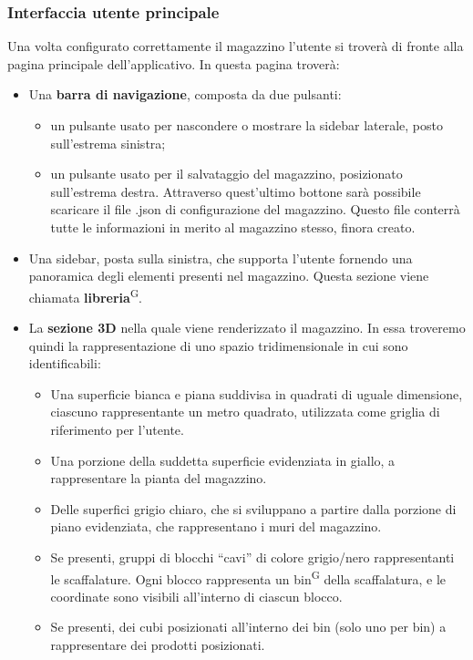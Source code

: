         \subsubsection{Interfaccia utente principale}
        Una volta configurato correttamente il magazzino l'utente si troverà di fronte alla pagina principale dell'applicativo. 
        In questa pagina troverà: 
        \begin{itemize}
            \item Una \textbf{barra di navigazione}, composta da due pulsanti: 
            \begin{itemize}
                \item un pulsante usato per nascondere o mostrare la sidebar laterale, posto sull'estrema sinistra;
                \item un pulsante usato per il salvataggio del magazzino, posizionato sull'estrema destra. Attraverso quest'ultimo bottone sarà possibile scaricare il file .json di configurazione del magazzino. Questo file conterrà tutte le informazioni in merito al magazzino stesso, finora creato.
            \end{itemize}
            \item Una sidebar, posta sulla sinistra, che supporta l'utente fornendo una panoramica degli elementi presenti nel magazzino. Questa sezione viene chiamata \textbf{libreria}\textsuperscript{G}. 
            \item La \textbf{sezione 3D} nella quale viene renderizzato il magazzino. In essa troveremo quindi la rappresentazione di uno spazio tridimensionale in cui sono identificabili:
            \begin{itemize}
                \item Una superficie bianca e piana suddivisa in quadrati di uguale dimensione, ciascuno rappresentante un metro quadrato, utilizzata come griglia di riferimento per l'utente.
                \item Una porzione della suddetta superficie evidenziata in giallo, a rappresentare la pianta del magazzino.
                \item Delle superfici grigio chiaro, che si sviluppano a partire dalla porzione di piano evidenziata, che rappresentano i muri del magazzino.
                \item Se presenti, gruppi di blocchi ``cavi'' di colore grigio/nero rappresentanti le scaffalature. Ogni blocco rappresenta un bin\textsuperscript{G} della scaffalatura, e le coordinate sono visibili all'interno di ciascun blocco.
                \item Se presenti, dei cubi posizionati all'interno dei bin (solo uno per bin) a rappresentare dei prodotti posizionati.
            \end{itemize}
        \end{itemize}
